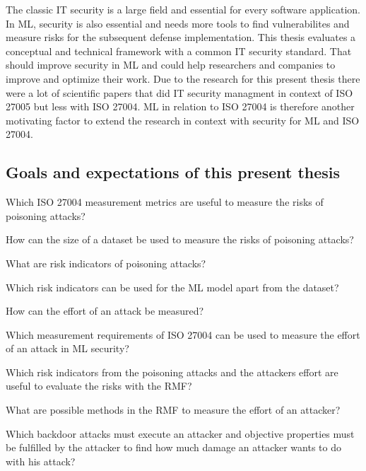 The classic IT security is a large field and essential for every software application. In ML, security is also essential and needs more tools to find vulnerabilites and measure risks for the subsequent defense implementation. This thesis evaluates a conceptual and technical framework with a common IT security standard. That should improve security in ML and could help researchers and companies to improve and optimize their work. Due to the research for this present thesis there were a lot of scientific papers that did IT security managment in context of ISO 27005 but less with ISO 27004. ML in relation to ISO 27004 is therefore another motivating factor to extend the research in context with security for ML and ISO 27004.

\subsection{Goals and expectations of this present thesis}


\begin{questions}
  \item Which ISO 27004 measurement metrics are useful to measure the risks of poisoning attacks? \label{itm:rq1}
  \item How can the size of a dataset be used to measure the risks of poisoning attacks? \label{itm:rq2}
  \item What are risk indicators of poisoning attacks? \label{itm:rq3}
  \item Which risk indicators can be used for the ML model apart from the dataset? \label{itm:rq4}
  \item How can the effort of an attack be measured? \label{itm:rq5}
  \item Which measurement requirements of ISO 27004 can be used to measure the effort of an attack in ML security? \label{itm:rq6}
  \item Which risk indicators from the poisoning attacks and the attackers effort are useful to evaluate the risks with the RMF? \label{itm:rq7}
  \item What are possible methods in the RMF to measure the effort of an attacker? \label{itm:rq8}
  \item Which backdoor attacks must execute an attacker and objective properties must be fulfilled by the attacker to find how much damage an attacker wants to do with his attack? \label{itm:rq9}
\end{questions}

